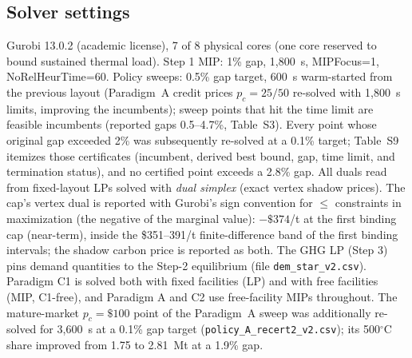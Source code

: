 \subsection{Solver settings}

Gurobi 13.0.2 (academic license), 7 of 8 physical cores (one core reserved to
bound sustained thermal load). Step 1 MIP: 1\% gap, 1{,}800~s,
MIPFocus=1, NoRelHeurTime=60. Policy sweeps: 0.5\% gap target, 600~s
warm-started from the previous layout (Paradigm~A credit prices
$p_c=25/50$ re-solved with 1{,}800~s limits, improving the incumbents);
sweep points that hit the time limit
are feasible incumbents (reported gaps 0.5--4.7\%, Table~S3). Every point whose
original gap exceeded 2\% was subsequently re-solved at a 0.1\% target; Table~S9
itemizes those certificates (incumbent, derived best bound, gap, time limit,
and termination status), and no certified point exceeds a 2.8\% gap. All duals read
from fixed-layout LPs
solved with \emph{dual simplex} (exact vertex shadow prices). The cap's
vertex dual is reported with Gurobi's sign convention for $\le$ constraints in
maximization (the negative of the marginal value): $-\$374$/t at the first
binding cap (near-term), inside the \$351--391/t finite-difference
band of the first binding intervals; the shadow carbon price is reported as both. The GHG LP
(Step 3) pins
demand quantities to the Step-2 equilibrium (file \texttt{dem\_star\_v2.csv}).
Paradigm C1 is solved both with fixed facilities (LP) and with free facilities
(MIP, C1-free), and Paradigm A and C2 use free-facility MIPs throughout. The
mature-market $p_c=\$100$ point of the Paradigm~A sweep was additionally
re-solved for 3{,}600~s at a 0.1\% gap target
(\texttt{policy\_A\_recert2\_v2.csv}); its 500$^\circ$C share improved from
1.75 to 2.81~Mt at a 1.9\% gap.

